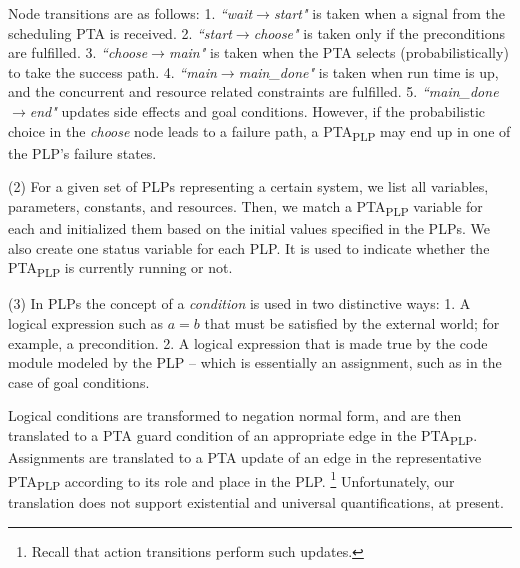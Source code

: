 \documentclass[letterpaper]{article}
\begin{document}
\par Node transitions 
are as follows: 1. \textit{``wait$\rightarrow$start"} is taken when a signal from the scheduling PTA is received. 2. \textit{``start$\rightarrow$choose"} is taken only if the preconditions are fulfilled. 3.  \textit{``choose$\rightarrow$main"} is taken when the PTA selects (probabilistically) to take the success path. 4. \textit{``main$\rightarrow$main\_done"} is taken when run time is up, and the concurrent and resource related constraints are fulfilled. 5. \textit{``main\_done$\rightarrow$end"} updates  side effects and goal conditions. 
However, if the probabilistic choice in the \textit{choose} node leads to a failure path,
a PTA\textsubscript{PLP} may end up in one of the PLP’s failure states. 

(2) For a given set of PLPs representing a certain system, we list all variables, parameters, constants, and resources. Then, we match a PTA\textsubscript{PLP} variable for each and initialized them based on
the initial values specified in the PLPs. We also create one status variable for each PLP. It is used to
indicate whether the PTA\textsubscript{PLP} is currently running or not.

(3) %
In PLPs the concept of a \textit{condition} is used in two distinctive ways: 1.  A logical expression  such as $a=b$ that must be satisfied by the external world; for example, a precondition. 
2. A logical expression that is made true by the code module modeled by the PLP -- which is essentially an assignment, such as in the case of goal conditions. 
\par Logical conditions are transformed to negation normal form, and
are then translated to a PTA guard condition of an appropriate edge in the PTA\textsubscript{PLP}.
Assignments are translated to a PTA update of an edge in 
the representative PTA\textsubscript{PLP} according to its role and place in the PLP.%
\footnote{Recall that action transitions perform such updates.}
Unfortunately, our translation does not support existential and universal quantifications,
at present.
\end{document}
